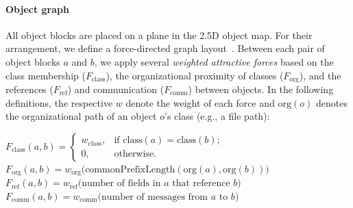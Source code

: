\paragraph{Object graph}
\label{sec:visualization_approach/mapping/object_graph}

All object blocks are placed on a plane in the 2.5D object map.
For their arrangement, we define a force-directed graph layout~\cite{fruchterman1991graph}.
Between each pair of object blocks $a$ and $b$, we apply several \emph{weighted attractive forces} based on the class membership ($F_\text{class}$), the organizational proximity of classes ($F_\text{org}$), and the references ($F_\text{ref}$) and communication ($F_\text{comm}$) between objects.
In the following definitions, the respective $w$ denote the weight of each force and $\text{org}(o)$ denotes the organizational path of an object $o$'s class (e.g., a file path):


\begin{algorithm}
	$F_{\text{class}}(a, b) = \begin{cases}w_{\text{class}}, & \text{if $\text{class}(a) = \text{class}(b)$;} \\ 0, & \text{otherwise}.\end{cases}$ \;
	$F_{\text{org}}(a, b) = w_{\text{org}}\bigl(\text{commonPrefixLength}(\text{org}(a), \text{org}(b))\bigr)$ \;
	$F_{\text{ref}}(a, b) = w_{\text{ref}}\bigl(\text{number of fields in $a$ that reference $b$}\bigr)$ \;
	$F_{\text{comm}}(a, b) = w_{\text{comm}}\bigl(\text{number of messages from $a$ to $b$}\bigr)$ \;
\end{algorithm}

